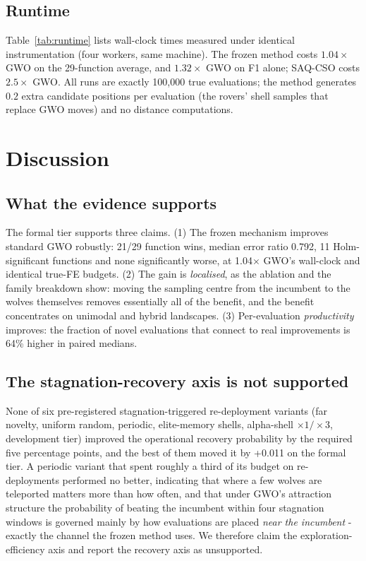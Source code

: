 \documentclass[journal]{IEEEtran}
\begin{document}
\subsection{Runtime}
\label{sec:runtime}
Table~\ref{tab:runtime} lists wall-clock times measured under identical
instrumentation (four workers, same machine). The frozen method costs
$1.04\times$ GWO on the 29-function average, and $1.32\times$ GWO on F1
alone; SAQ-CSO costs $2.5\times$ GWO. All runs are exactly 100{,}000 true
evaluations; the method generates $0.2$ extra candidate positions per
evaluation (the rovers' shell samples that replace GWO moves) and no
distance computations.

\begin{table}[t]
\centering
\caption{Wall-clock per run (mean over 870 runs per algorithm) and
candidate-generation cost. ``Candidates/FE'' counts generated positions that
receive a true evaluation or replace one.}
\label{tab:runtime}

\end{table}

\section{Discussion}
\label{sec:discussion}
\subsection{What the evidence supports}
The formal tier supports three claims. (1) The frozen mechanism improves
standard GWO robustly: 21/29 function wins, median error ratio 0.792, 11
Holm-significant functions and none significantly worse, at 1.04$\times$
GWO's wall-clock and identical true-FE budgets. (2) The gain is
\emph{localised}, as the ablation and the family breakdown show: moving the
sampling centre from the incumbent to the wolves themselves removes
essentially all of the benefit, and the benefit concentrates on unimodal and
hybrid landscapes. (3) Per-evaluation \emph{productivity} improves: the
fraction of novel evaluations that connect to real improvements is 64\%
higher in paired medians.
\subsection{The stagnation-recovery axis is not supported}
None of six pre-registered stagnation-triggered re-deployment variants
(far novelty, uniform random, periodic, elite-memory shells, alpha-shell
$\times1/\times3$, development tier) improved the operational recovery
probability by the required five percentage points, and the best of them
moved it by +0.011 on the formal tier. A periodic variant that spent
roughly a third of its budget on re-deployments performed no better,
indicating that where a few wolves are teleported matters more than how
often, and that under GWO's attraction structure the probability of beating
the incumbent within four stagnation windows is governed mainly by how
evaluations are placed \emph{near the incumbent} - exactly the channel the
frozen method uses. We therefore claim the exploration-efficiency axis and
report the recovery axis as unsupported.
\end{document}
